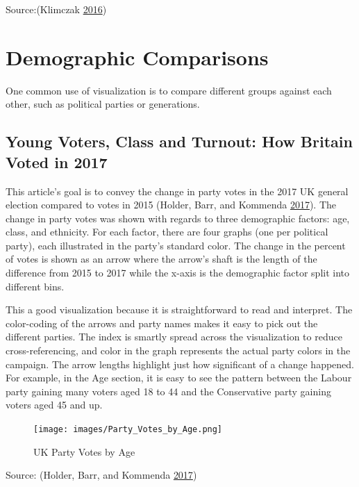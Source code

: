 \documentclass[]{book}
\begin{document}
Source:(Klimczak \protect\hyperlink{ref-uber_maps}{2016})

\hypertarget{demographic-comparisons}{%
\section{Demographic Comparisons}\label{demographic-comparisons}}

One common use of visualization is to compare different groups against each other, such as political parties or generations.

\hypertarget{young-voters-class-and-turnout-how-britain-voted-in-2017}{%
\subsection{Young Voters, Class and Turnout: How Britain Voted in 2017}\label{young-voters-class-and-turnout-how-britain-voted-in-2017}}

This article's goal is to convey the change in party votes in the 2017 UK general election compared to votes in 2015 (Holder, Barr, and Kommenda \protect\hyperlink{ref-UKvotes2017}{2017}). The change in party votes was shown with regards to three demographic factors: age, class, and ethnicity. For each factor, there are four graphs (one per political party), each illustrated in the party's standard color. The change in the percent of votes is shown as an arrow where the arrow's shaft is the length of the difference from 2015 to 2017 while the x-axis is the demographic factor split into different bins.

This a good visualization because it is straightforward to read and interpret. The color-coding of the arrows and party names makes it easy to pick out the different parties. The index is smartly spread across the visualization to reduce cross-referencing, and color in the graph represents the actual party colors in the campaign. The arrow lengths highlight just how significant of a change happened. For example, in the Age section, it is easy to see the pattern between the Labour party gaining many voters aged 18 to 44 and the Conservative party gaining voters aged 45 and up.

\begin{figure}
\centering
\texttt{[image: images/Party\_Votes\_by\_Age.png]}
\caption{UK Party Votes by Age}
\end{figure}

Source: (Holder, Barr, and Kommenda \protect\hyperlink{ref-UKvotes2017}{2017})
\end{document}
